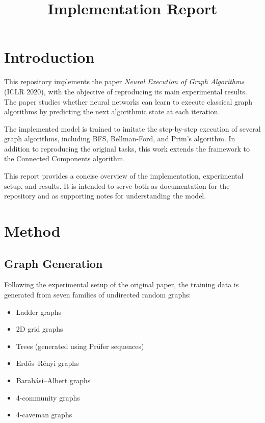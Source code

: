 \documentclass[11pt, a4paper]{article}
\title{\textbf{\textcolor{accent}{Implementation Report}}}
\author{}
\date{}
\begin{document}
\maketitle
\vspace{-7em}

\section{Introduction}

This repository implements the paper \textit{Neural Execution of Graph Algorithms}~\cite{velickovic2019neural} (ICLR 2020), with the objective of reproducing its main experimental results. The paper studies whether neural networks can learn to execute classical graph algorithms by predicting the next algorithmic state at each iteration.

The implemented model is trained to imitate the step-by-step execution of several graph algorithms, including BFS, Bellman-Ford, and Prim's algorithm. In addition to reproducing the original tasks, this work extends the framework to the Connected Components algorithm.

This report provides a concise overview of the implementation, experimental setup, and results. It is intended to serve both as documentation for the repository and as supporting notes for understanding the model.

\section{Method}

\subsection{Graph Generation}

Following the experimental setup of the original paper, the training data is generated from seven families of undirected random graphs:
\begin{itemize}
\item Ladder graphs
\item 2D grid graphs
\item Trees (generated using Pr\"ufer sequences)
\item Erd\H{o}s--R\'enyi graphs
\item Barab\'asi--Albert graphs
\item 4-community graphs
\item 4-caveman graphs
\end{itemize}
\end{document}

